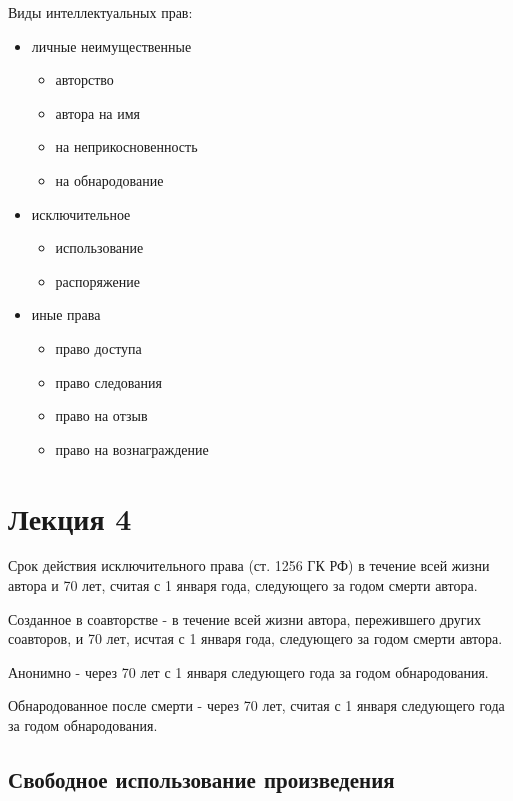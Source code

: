 \documentclass[12pt]{article}
\begin{document}
Виды интеллектуальных прав:
\begin{itemize}
    \item личные неимущественные
    \begin{itemize}
    \item авторство
    \item автора на имя
    \item на неприкосновенность
    \item на обнародование
    \end{itemize}
    \item исключительное
    \begin{itemize}
    \item использование
    \item распоряжение
    \end{itemize}   
    \item иные права
    \begin{itemize}
    \item право доступа
    \item право следования
    \item право на отзыв
    \item право на вознаграждение
\end{itemize}   
\end{itemize}
\section{Лекция 4}
Срок действия исключительного права (ст. 1256 ГК РФ)
в течение всей жизни автора и 70 лет, считая с 1 
января года, следующего за годом смерти автора.

Созданное в соавторстве - в течение всей жизни автора, 
пережившего других соавторов, и 70 лет, исчтая с 1 января года,
следующего за годом смерти автора.

Анонимно - через 70 лет с 1 января следующего года за годом обнародования.

Обнародованное после смерти - через 70 лет, считая 
с 1 января следующего года за годом обнародования.
\hypertarget{ux441ux432ux43eux431ux43eux434ux43dux43eux435-ux438ux441ux43fux43eux43bux44cux437ux43eux432ux430ux43dux438ux435-ux43fux440ux43eux438ux437ux432ux435ux434ux435ux43dux438ux44f}{%
\subsection{Свободное использование
произведения}\label{ux441ux432ux43eux431ux43eux434ux43dux43eux435-ux438ux441ux43fux43eux43bux44cux437ux43eux432ux430ux43dux438ux435-ux43fux440ux43eux438ux437ux432ux435ux434ux435ux43dux438ux44f}}
\end{document}
